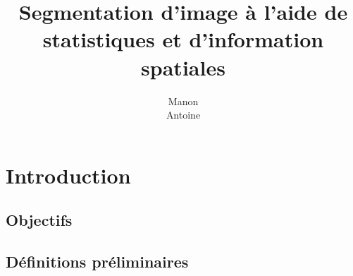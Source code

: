 \documentclass[12pt,titlepage,a4paper]{report}
\title{Segmentation d'image à l'aide de statistiques et d'information spatiales}
\author{Manon \bsc{Ansart}\\Antoine \bsc{Augusti}}
\begin{document}
	\dominitoc
	\tableofcontents

	\chapter{Introduction}
	\minitoc
		\section{Objectifs}
			
		
		\section{Définitions préliminaires}
			

	
	
\end{document}
